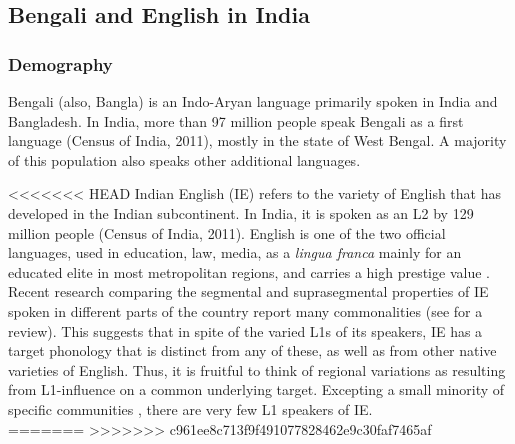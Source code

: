 \documentclass[charis,linguex]{glossa}
\begin{document}
\subsection{Bengali and English in India} \label{bengali_english_in_india}

\subsubsection{Demography} 

Bengali (also, Bangla) is an Indo-Aryan language primarily spoken in India and Bangladesh. In India, more than 97 million people speak Bengali as a first language (Census of India, 2011), mostly in the state of West Bengal. A majority of this population also speaks other additional languages.

<<<<<<< HEAD
Indian English (IE) refers to the variety of English that has developed in the Indian subcontinent. In India, it is spoken as an L2 by 129 million people (Census of India, 2011).  English is one of the two official languages, used in education, law, media, as a \emph{lingua franca} mainly for an educated elite in most metropolitan regions, and carries a high prestige value \citep{pandey201517, kachru1981english, tollefson2014language, kachru1983indianization}.
Recent research comparing the segmental and suprasegmental properties of IE spoken in different parts of the country report many commonalities (see \cite{sirsa2013effects} for a review). This suggests that in spite of the varied L1s of its speakers, IE has a target phonology that is distinct from any of these, as well as from other native varieties of English. Thus, it is fruitful to think of regional variations as resulting from L1-influence on a common underlying target. Excepting a small minority of specific communities \citep{pandey201517, wells1982accents, coelho1997anglo}, there are very few L1 speakers of IE.\\

=======
>>>>>>> c961ee8c713f9f491077828462e9c30faf7465af
\end{document}
